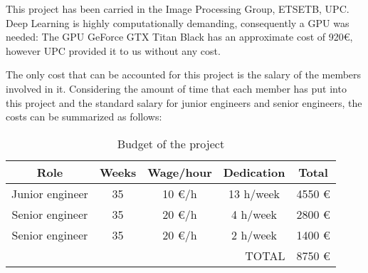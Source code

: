 \documentclass[../main.tex]{subfiles}
\begin{document}
This project has been carried in the Image Processing Group, ETSETB, UPC. Deep Learning is
highly computationally demanding, consequently a GPU was needed: The GPU GeForce GTX
Titan Black has an approximate cost of 920\euro{}, however UPC provided it to us without any cost.

The only cost that can be accounted for this project is the salary of the members involved
in it. Considering the amount of time that each member has put into this project and the
standard salary for junior engineers and senior engineers, the costs can
be summarized as follows:

\begin{table}[h]
\centering
\begin{tabular}{*5c}
\toprule
Role & Weeks & Wage/hour & Dedication & Total \\
\midrule
Junior engineer & 35 & 10 \euro{}/h & 13 h/week & 4550 \euro{} \\
Senior engineer & 35 & 20 \euro{}/h & 4 h/week & 2800 \euro{} \\
Senior engineer & 35 & 20 \euro{}/h & 2 h/week & 1400 \euro{} \\
\midrule
\midrule
\multicolumn{4}{r}{TOTAL} & 8750 \euro{} \\
\bottomrule
\end{tabular}
\caption{Budget of the project}
\label{tab:budget}
\end{table}
\end{document}
